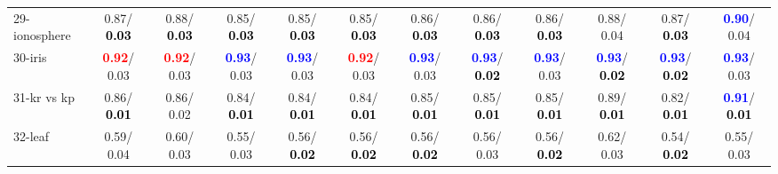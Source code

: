 \begin{table}[h]
\begin{center}
{\begin{tabular}{lc|c|c|c|c|c|c|c|c|c|c}
29-ionosphere &   0.87/\textcolor{black}{\textbf{  0.03}} &   0.88/\textcolor{black}{\textbf{  0.03}} &   0.85/\textcolor{black}{\textbf{  0.03}} &   0.85/\textcolor{black}{\textbf{  0.03}} &   0.85/\textcolor{black}{\textbf{  0.03}} &   0.86/\textcolor{black}{\textbf{  0.03}} &   0.86/\textcolor{black}{\textbf{  0.03}} &   0.86/\textcolor{black}{\textbf{  0.03}} &   0.88/  0.04 &   0.87/\textcolor{black}{\textbf{  0.03}} & \textcolor{blue}{\textbf{  0.90}}/  0.04 \\
30-iris & \textcolor{red}{\textbf{  0.92}}/  0.03 & \textcolor{red}{\textbf{  0.92}}/  0.03 & \textcolor{blue}{\textbf{  0.93}}/  0.03 & \textcolor{blue}{\textbf{  0.93}}/  0.03 & \textcolor{red}{\textbf{  0.92}}/  0.03 & \textcolor{blue}{\textbf{  0.93}}/  0.03 & \textcolor{blue}{\textbf{  0.93}}/\textcolor{black}{\textbf{  0.02}} & \textcolor{blue}{\textbf{  0.93}}/  0.03 & \textcolor{blue}{\textbf{  0.93}}/\textcolor{black}{\textbf{  0.02}} & \textcolor{blue}{\textbf{  0.93}}/\textcolor{black}{\textbf{  0.02}} & \textcolor{blue}{\textbf{  0.93}}/  0.03 \\
31-kr vs kp &   0.86/\textcolor{black}{\textbf{  0.01}} &   0.86/  0.02 &   0.84/\textcolor{black}{\textbf{  0.01}} &   0.84/\textcolor{black}{\textbf{  0.01}} &   0.84/\textcolor{black}{\textbf{  0.01}} &   0.85/\textcolor{black}{\textbf{  0.01}} &   0.85/\textcolor{black}{\textbf{  0.01}} &   0.85/\textcolor{black}{\textbf{  0.01}} &   0.89/\textcolor{black}{\textbf{  0.01}} &   0.82/\textcolor{black}{\textbf{  0.01}} & \textcolor{blue}{\textbf{  0.91}}/\textcolor{black}{\textbf{  0.01}} \\
32-leaf &   0.59/  0.04 &   0.60/  0.03 &   0.55/  0.03 &   0.56/\textcolor{black}{\textbf{  0.02}} &   0.56/\textcolor{black}{\textbf{  0.02}} &   0.56/\textcolor{black}{\textbf{  0.02}} &   0.56/  0.03 &   0.56/\textcolor{black}{\textbf{  0.02}} &   0.62/  0.03 &   0.54/\textcolor{black}{\textbf{  0.02}} &   0.55/  0.03 \\\end{tabular}
}\label{strats0aRFw}
\end{center}
\end{table}
